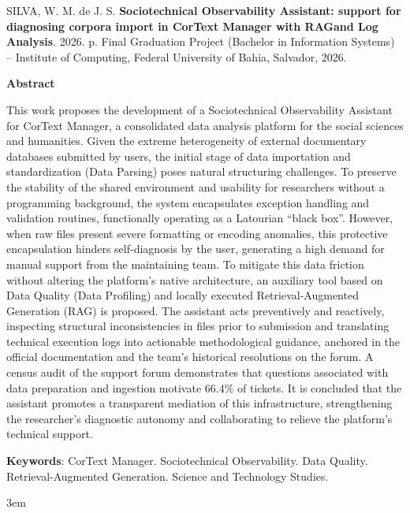 \documentclass[
	oneside,
	a4paper,
	12pt,
	chapter=TITLE,
	section=TITLE,
	english,
	brazilian
]{abntex2}
\def\MakeUppercase#1{#1}%
\begin{document}
\begin{resumo}[Abstract]
  \SingleSpacing
  \noindent SILVA, W. M. de J. S. \textbf{Sociotechnical Observability Assistant: support for diagnosing corpora import in CorText Manager with RAG\space and Log Analysis}. 2026. \pageref{LastPage} p. Final Graduation Project (Bachelor in Information Systems) -- Institute of Computing, Federal University of Bahia, Salvador, 2026.

  \vspace{1.0cm}
  \begin{center}
    {\ABNTEXchapterfontsize\bfseries\MakeUppercase{Abstract}}
  \end{center}
  \vspace{0.6cm}

  \noindent This work proposes the development of a Sociotechnical Observability Assistant for CorText Manager, a consolidated data analysis platform for the social sciences and humanities. Given the extreme heterogeneity of external documentary databases submitted by users, the initial stage of data importation and standardization (Data Parsing) poses natural structuring challenges. To preserve the stability of the shared environment and usability for researchers without a programming background, the system encapsulates exception handling and validation routines, functionally operating as a Latourian ``black box''. However, when raw files present severe formatting or encoding anomalies, this protective encapsulation hinders self-diagnosis by the user, generating a high demand for manual support from the maintaining team. To mitigate this data friction without altering the platform's native architecture, an auxiliary tool based on Data Quality (Data Profiling) and locally executed Retrieval-Augmented Generation (RAG) is proposed. The assistant acts preventively and reactively, inspecting structural inconsistencies in files prior to submission and translating technical execution logs into actionable methodological guidance, anchored in the official documentation and the team's historical resolutions on the forum. A census audit of the support forum demonstrates that questions associated with data preparation and ingestion motivate 66.4\% of tickets. It is concluded that the assistant promotes a transparent mediation of this infrastructure, strengthening the researcher's diagnostic autonomy and collaborating to relieve the platform's technical support.

  \vspace{0.5cm}
  \noindent\textbf{Keywords}: CorText Manager. Sociotechnical Observability. Data Quality. Retrieval-Augmented Generation. Science and Technology Studies.
\end{resumo}
\emergencystretch 3em
\hfuzz 1pt
\end{document}
